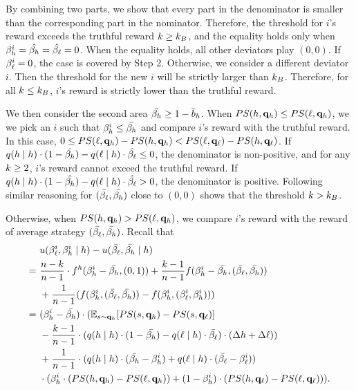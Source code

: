 By combining two parts, we show that every part in the denominator is smaller than the corresponding part in the nominator. Therefore, the threshold for $i$'s reward exceeds the truthful reward $k \ge k_B$, and the equality holds only when $\beta_{h}^i = \hat{\beta_{h}} = \hat{\beta_{\ell}} = 0$. When the equality holds, all other deviators play $(0, 0)$. If $\beta_{\ell}^i = 0$, the case is covered by Step 2. Otherwise, we consider a different deviator $i$. Then the threshold for the new $i$ will be strictly larger than $k_B$. Therefore, for all $k \le k_B$, $i$'s reward is strictly lower than the truthful reward. 

We then consider the second area $\bar{\beta_{h}} \ge 1 - \bar{b}_h$.
When $PS(h, \mathbf{q}_h) \le PS(\ell, \mathbf{q}_h)$, we we pick an $i$ such that $\beta_{h}^i \le \bar{\beta_{h}}$ and compare $i$'s reward with the truthful reward. In this case, $ 0\le PS(\ell, \mathbf{q}_h) - PS(h, \mathbf{q}_h) < PS(\ell, \mathbf{q}_\ell) - PS(h, \mathbf{q}_\ell)$. If $q(h\mid h)\cdot (1 - \hat{\beta_{h}}) - q(\ell \mid h) \cdot \hat{\beta_{\ell}} \le 0$, the denominator is non-positive, and for any $k \ge 2$, $i$'s reward cannot exceed the truthful reward. If $q(h\mid h)\cdot (1 - \hat{\beta_{h}}) - q(\ell \mid h) \cdot \hat{\beta_{\ell}} > 0$, the denominator is positive. Following similar reasoning for $(\bar{\beta_{\ell}}, \bar{\beta_{h}})$ close to $(0, 0)$ shows that the threshold $k > k_B$. 


Otherwise, when $PS(h, \mathbf{q}_h) > PS(\ell, \mathbf{q}_h)$, we compare $i$'s reward with the reward of average strategy $(\bar{\beta_{\ell}}, \bar{\beta_{h}})$. Recall that 
\begin{align*}
    &\ u(\beta_{\ell}^i, \beta_{h}^i \mid h) - u(\bar{\beta_{\ell}}, \bar{\beta_{h}} \mid h)\\ 
    =&\ \frac{n-k}{n - 1} \cdot f^h(\beta_{h}^i - \bar{\beta_{h}}, (0, 1)) + \frac{k - 1}{n - 1} f(\beta_{h}^i - \bar{\beta_{h}}, (\bar{\beta_{\ell}}, \bar{\beta_{h}}))\\
    &\ +\frac{1}{n-1} (f(\beta_{h}^i, (\bar{\beta_{\ell}}, \bar{\beta_{h}})) - f(\beta_{h}^i, (\beta_{\ell}^i, \beta_{h}^i)))\\
    =&\ (\beta_{h}^i - \bar{\beta_{h}})\cdot (\mathbb{E}_{s\sim \mathbf{q}_{h}}[PS(s, \mathbf{q}_{h}) - PS(s, \mathbf{q}_{\ell})] \\
    &\ -\frac{k - 1}{n - 1} \cdot (q(h \mid h)\cdot ( 1- \bar{\beta_{h}}) - q(\ell \mid h) \cdot \bar{\beta_{\ell}}) \cdot (\Delta h + \Delta \ell))\\
    &\ + \frac{1}{n - 1} \cdot (q(h \mid h) \cdot (\bar{\beta_{h}} - \beta_{h}^i) + q(\ell \mid h) \cdot (\bar{\beta_{\ell}} - \beta_{\ell}^i))\\
    &\ \cdot (\beta_{h}^i \cdot (PS(h, \mathbf{q}_h) - PS(\ell, \mathbf{q}_h)) + ( 1- \beta_{h}^i) \cdot (PS(h, \mathbf{q}_\ell) - PS(\ell, \mathbf{q}_\ell))). 
\end{align*}


